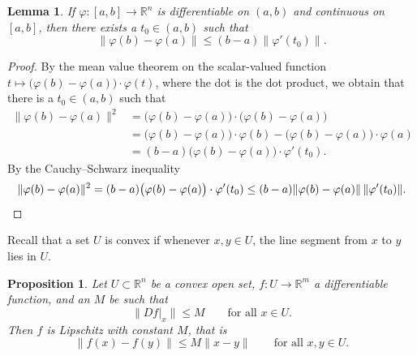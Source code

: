 \documentclass[12pt,openany]{book}
\newcommand{\snorm}[1]{\lVert {#1} \rVert}
\newcommand{\R}{{\mathbb{R}}}
\theoremstyle{plain}
\newtheorem{lemma}[thm]{Lemma}
\newtheorem{prop}[thm]{Proposition}
\theoremstyle{remark}
\theoremstyle{definition}
\theoremstyle{exercise}
\theoremstyle{example}
\begin{document}
\begin{lemma}
If $\varphi \colon [a,b] \to \R^n$ is differentiable on $(a,b)$ and
continuous on $[a,b]$, then there exists a $t_0 \in (a,b)$ such that
\begin{equation*}
\snorm{\varphi(b)-\varphi(a)} \leq (b-a) \snorm{\varphi'(t_0)} .
\end{equation*}
\end{lemma}

\begin{proof}
By the mean value theorem on the scalar-valued function
$t \mapsto \bigl(\varphi(b)-\varphi(a) \bigr) \cdot \varphi(t)$,
where the dot is the dot product, we obtain
that
there is a $t_0 \in (a,b)$ such that
\begin{equation*}
\begin{split}
\snorm{\varphi(b)-\varphi(a)}^2
& =
\bigl( \varphi(b)-\varphi(a) \bigr)
\cdot
\bigl( \varphi(b)-\varphi(a) \bigr)
\\
& =
\bigl(\varphi(b)-\varphi(a) \bigr) \cdot \varphi(b) - 
\bigl(\varphi(b)-\varphi(a) \bigr) \cdot \varphi(a)
\\
& = 
(b-a)
\bigl(\varphi(b)-\varphi(a) \bigr) \cdot \varphi'(t_0) .
\end{split}
\end{equation*}
By the Cauchy--Schwarz inequality
\begin{equation*}
\snorm{\varphi(b)-\varphi(a)}^2
=
(b-a)\bigl(\varphi(b)-\varphi(a) \bigr) \cdot \varphi'(t_0)
\leq
(b-a)
\snorm{\varphi(b)-\varphi(a)} \, \snorm{\varphi'(t_0)} . \qedhere
\end{equation*}
\end{proof}

Recall that a set $U$ is convex
if whenever $x,y \in U$, the line segment from
$x$ to $y$ lies in $U$.

\begin{prop} \label{mv:prop:convexlip}
Let $U \subset \R^n$ be a convex open set, $f \colon U \to \R^m$
a differentiable function, and an $M$ be such that
\begin{equation*}
\snorm{Df|_x} \leq M
\qquad \text{for all } x \in U.
\end{equation*}
Then $f$ is Lipschitz with constant $M$, that is
\begin{equation*}
\snorm{f(x)-f(y)} \leq M \snorm{x-y}
\qquad
\text{for all } x,y \in U.
\end{equation*}
\end{prop}
\end{document}
